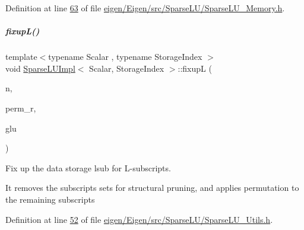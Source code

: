 Definition at line \hyperlink{eigen_2_eigen_2src_2_sparse_l_u_2_sparse_l_u___memory_8h_source_l00063}{63} of file \hyperlink{eigen_2_eigen_2src_2_sparse_l_u_2_sparse_l_u___memory_8h_source}{eigen/\+Eigen/src/\+Sparse\+L\+U/\+Sparse\+L\+U\+\_\+\+Memory.\+h}.

\mbox{\label{group___sparse_l_u___module_ae1d1ed091956ff4e5734b4e3f79f866e}} 
\subparagraph{\texorpdfstring{fixup\+L()}{fixupL()}}
{\footnotesize\ttfamily template$<$typename Scalar , typename Storage\+Index $>$ \\
void \hyperlink{group___sparse_l_u___module_class_eigen_1_1internal_1_1_sparse_l_u_impl}{Sparse\+L\+U\+Impl}$<$ Scalar, Storage\+Index $>$\+::fixupL (\begin{DoxyParamCaption}\item[{const \hyperlink{namespace_eigen_a62e77e0933482dafde8fe197d9a2cfde}{Index}}]{n,  }\item[{const \hyperlink{group___core___module}{Index\+Vector} \&}]{perm\+\_\+r,  }\item[{\hyperlink{struct_eigen_1_1internal_1_1_l_u___global_l_u__t}{Global\+L\+U\+\_\+t} \&}]{glu }\end{DoxyParamCaption})\hspace{0.3cm}{\ttfamily [protected]}}



Fix up the data storage lsub for L-\/subscripts. 

It removes the subscripts sets for structural pruning, and applies permutation to the remaining subscripts 

Definition at line \hyperlink{eigen_2_eigen_2src_2_sparse_l_u_2_sparse_l_u___utils_8h_source_l00052}{52} of file \hyperlink{eigen_2_eigen_2src_2_sparse_l_u_2_sparse_l_u___utils_8h_source}{eigen/\+Eigen/src/\+Sparse\+L\+U/\+Sparse\+L\+U\+\_\+\+Utils.\+h}.

